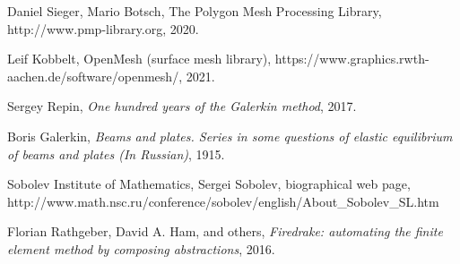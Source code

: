 \documentclass[11pt,a4paper]{memoir}
\begin{document}
\begin{thebibliography}{9}
Daniel Sieger, Mario Botsch,
The Polygon Mesh Processing Library,
http://www.pmp-library.org,
2020.

Leif Kobbelt,
OpenMesh (surface mesh library),
https://www.graphics.rwth-aachen.de/software/openmesh/,
2021.

Sergey Repin,
\textit{One hundred  years of the Galerkin method},
2017.

Boris Galerkin,
\textit{Beams and plates. Series in some questions of elastic equilibrium of beams and plates (In Russian)},
1915.

Sobolev Institute of Mathematics,
Sergei Sobolev, biographical web page,
http://www.math.nsc.ru/conference/sobolev/english/About\_Sobolev\_SL.htm

Florian Rathgeber, David A. Ham, and others,
\textit{Firedrake: automating the finite element method by composing abstractions},
2016.


\end{thebibliography}
\end{document}
